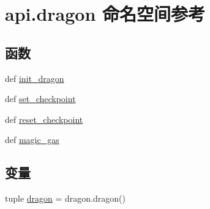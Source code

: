 \hypertarget{namespaceapi_1_1dragon}{\section{api.\-dragon 命名空间参考}
\label{namespaceapi_1_1dragon}
}
\subsection*{函数}
\begin{DoxyCompactItemize}
\item 
def \hyperlink{namespaceapi_1_1dragon_a3dda3161c39b3734f9d34caefece9216}{init\-\_\-dragon}
\item 
def \hyperlink{namespaceapi_1_1dragon_a725a71b872a21c1a7eb4e79a9200894d}{set\-\_\-checkpoint}
\item 
def \hyperlink{namespaceapi_1_1dragon_aa7bd2bae981d5a225bf8eb7a4d25eca9}{reset\-\_\-checkpoint}
\item 
def \hyperlink{namespaceapi_1_1dragon_a752ffeb9f8b4a3fa2f4fccb66f3d6501}{magic\-\_\-gas}
\end{DoxyCompactItemize}
\subsection*{变量}
\begin{DoxyCompactItemize}
\item 
tuple \hyperlink{namespaceapi_1_1dragon_a43065da32920c8618fa1ff016c3a7568}{dragon} = dragon.\-dragon()
\end{DoxyCompactItemize}


